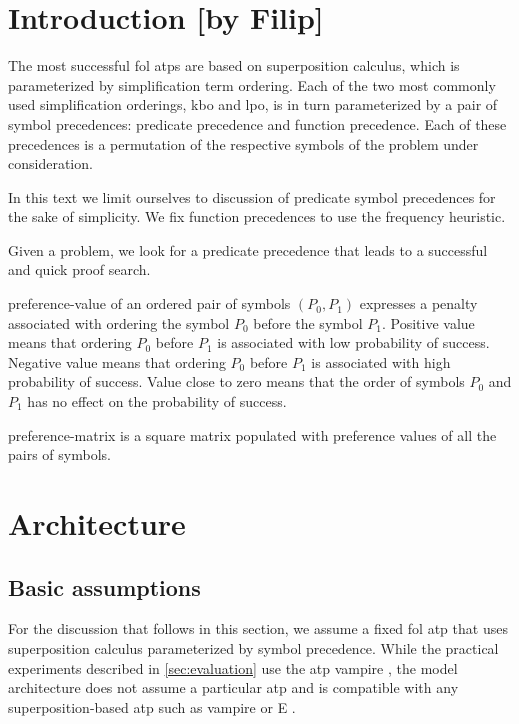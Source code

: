 \newpage

\section{Introduction [by Filip]}

The most successful \gls{fol} \glspl{atp} are based on superposition calculus,
which is parameterized by simplification term ordering.
Each of the two most commonly used simplification orderings, \gls{kbo} and \gls{lpo},
is in turn parameterized by a pair of symbol precedences:
predicate precedence and function precedence.
Each of these precedences is a permutation of the respective symbols of the problem under consideration.

In this text we limit ourselves to discussion of predicate symbol precedences for the sake of simplicity.
We fix function precedences to use the frequency heuristic.

Given a problem, we look for a predicate \gls{precedence} that leads to a successful and quick proof search.

\Gls{preference-value} of an ordered pair of symbols \((P_0, P_1)\) expresses a penalty associated with ordering the symbol \(P_0\) before the symbol \(P_1\).
Positive value means that ordering \(P_0\) before \(P_1\) is associated with low probability of success.
Negative value means that ordering \(P_0\) before \(P_1\) is associated with high probability of success.
Value close to zero means that the order of symbols \(P_0\) and \(P_1\) has no effect on the probability of success.

\Gls{preference-matrix} is a square matrix populated with preference values of all the pairs of symbols.

\section{Architecture}

\subsection{Basic assumptions}

For the discussion that follows in this section,
we assume a fixed \gls{fol} \gls{atp} that uses superposition calculus parameterized by symbol precedence.
While the practical experiments described in \autoref{sec:evaluation} use the \gls{atp} \gls{vampire} \cite{Kovacs2013},
the model architecture does not assume a particular \gls{atp}
and is compatible with any superposition-based \gls{atp} such as \gls{vampire} or E \cite{SCV:CADE-2019}.

